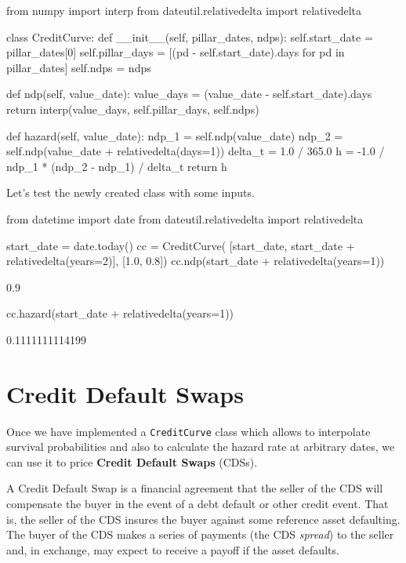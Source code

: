 \begin{ipython}
from numpy import interp
from dateutil.relativedelta import relativedelta

class CreditCurve:
    def __init__(self, pillar_dates, ndps):
        self.start_date = pillar_dates[0]
        self.pillar_days = [(pd - self.start_date).days for pd in pillar_dates]
        self.ndps = ndps
    
    def ndp(self, value_date):
        value_days = (value_date - self.start_date).days
        return interp(value_days, self.pillar_days, self.ndps)

    def hazard(self, value_date):
        ndp_1 = self.ndp(value_date)
        ndp_2 = self.ndp(value_date + relativedelta(days=1))
        delta_t = 1.0 / 365.0
        h = -1.0 / ndp_1 * (ndp_2 - ndp_1) / delta_t
        return h
\end{ipython}

Let's test the newly created class with some inputs.
\begin{ipython}
from datetime import date
from dateutil.relativedelta import relativedelta

start_date = date.today()
cc = CreditCurve(
    [start_date, start_date + relativedelta(years=2)],
    [1.0, 0.8])
cc.ndp(start_date + relativedelta(years=1))
\end{ipython}
\begin{ioutput}
0.9
\end{ioutput}
\begin{ipython}
cc.hazard(start_date + relativedelta(years=1))
\end{ipython}
\begin{ioutput}
0.1111111114199
\end{ioutput}
            
\section{Credit Default Swaps}\label{credit-deafult-swaps}

Once we have implemented a \texttt{CreditCurve} class which allows to interpolate survival probabilities and also to calculate the hazard rate at arbitrary dates, we can use it to price \textbf{Credit Default Swaps} (CDSs).

A Credit Default Swap is a financial agreement that the seller of the CDS will compensate the buyer in the event of a debt default or other credit event. 
That is, the seller of the CDS insures the buyer against some reference asset defaulting. The buyer of the CDS makes a series of payments (the CDS \emph{spread}) to the seller and, in exchange, may expect to receive a payoff if the asset defaults.

